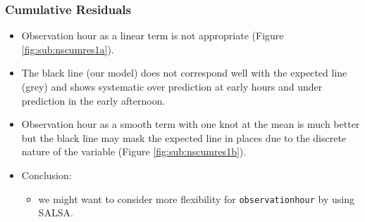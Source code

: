 \begin{frame}
\frametitle{Cumulative Residuals}
\begin{itemize}
\item Observation hour as a linear term is not appropriate (Figure \ref{fig:sub:nscumres1a}).
\item The black line (our model) does not correspond well with the expected line (grey) and shows systematic over prediction at early hours and under prediction in the early afternoon.
\item Observation hour as a smooth term with one knot at the mean is much better but the black line may mask the expected line in places due to the discrete nature of the variable (Figure \ref{fig:sub:nscumres1b}).
\pause
\item Conclusion:  
\begin{itemize}
  \item we might want to consider more flexibility for {\tt observationhour} by using SALSA.
\end{itemize}
\end{itemize}
\end{frame}


